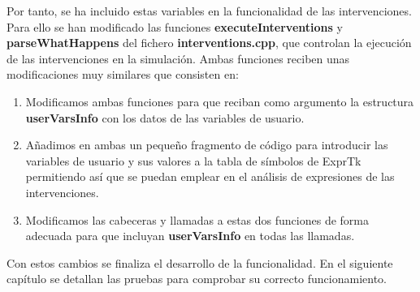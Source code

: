Por tanto, se ha incluido estas variables en la funcionalidad de las intervenciones. Para ello se han modificado las funciones \textbf{executeInterventions} y \textbf{parseWhatHappens} del fichero \textbf{interventions.cpp}, que controlan la ejecución de las intervenciones en la simulación.
Ambas funciones reciben unas modificaciones muy similares que consisten en:
\begin{enumerate}
	\item Modificamos ambas funciones para que reciban como argumento la estructura \textbf{userVarsInfo} con los datos de las variables de usuario.
	\item Añadimos en ambas un pequeño fragmento de código para introducir las variables de usuario y sus valores a la tabla de símbolos de ExprTk\cite{Exprtk} permitiendo así que se puedan emplear en el análisis de expresiones de las intervenciones.
	\item Modificamos las cabeceras y llamadas a estas dos funciones de forma adecuada para que incluyan \textbf{userVarsInfo} en todas las llamadas. 
\end{enumerate}

Con estos cambios se finaliza el desarrollo de la funcionalidad. En el siguiente capítulo se detallan las pruebas para comprobar su correcto funcionamiento.


